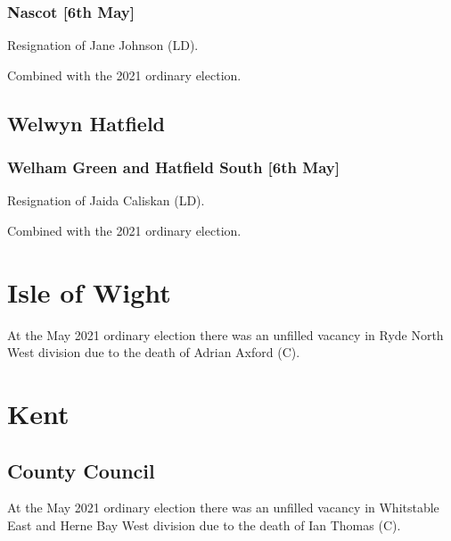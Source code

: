 \documentclass[a4paper,openany]{book}
\begin{document}
\begin{resultsiii}
\subsubsection*{Nascot \hspace*{\fill}\nolinebreak[1]%
	\enspace\hspace*{\fill}
	[6th May]}


Resignation of Jane Johnson (LD).

Combined with the 2021 ordinary election.

\subsection*{Welwyn Hatfield}

\subsubsection*{Welham Green and Hatfield South \hspace*{\fill}\nolinebreak[1]%
	\enspace\hspace*{\fill}
	[6th May]}


Resignation of Jaida Caliskan (LD).

Combined with the 2021 ordinary election.

\section{Isle of Wight}

At the May 2021 ordinary election there was an unfilled vacancy in Ryde North West division due to the death of Adrian Axford (C).

\section{Kent}

\subsection*{County Council}

At the May 2021 ordinary election there was an unfilled vacancy in Whitstable East and Herne Bay West division due to the death of Ian Thomas (C).


\end{resultsiii}
\end{document}
